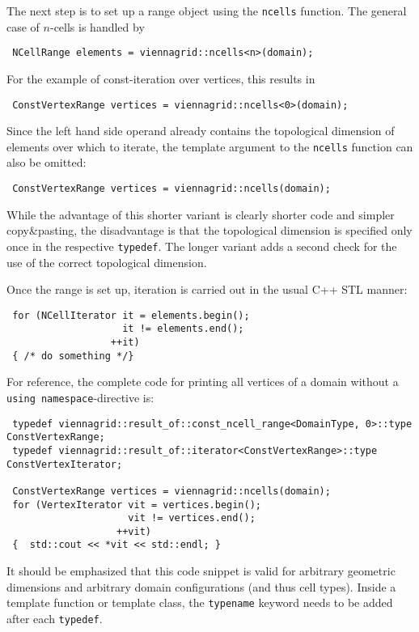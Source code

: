 The next step is to set up a range object using the \lstinline|ncells| function.
The general case of $n$-cells is handled by
\begin{lstlisting}
 NCellRange elements = viennagrid::ncells<n>(domain);
\end{lstlisting}
For the example of const-iteration over vertices, this results in
\begin{lstlisting}
 ConstVertexRange vertices = viennagrid::ncells<0>(domain);
\end{lstlisting}
Since the left hand side operand already contains the topological dimension of elements over which to iterate, 
the template argument to the \lstinline|ncells| function can also be omitted:
\begin{lstlisting}
 ConstVertexRange vertices = viennagrid::ncells(domain);
\end{lstlisting}
While the advantage of this shorter variant is clearly shorter code and simpler copy\&pasting, the disadvantage is that the topological dimension is specified only once in the respective \lstinline|typedef|. The longer variant adds a second check for the use of the correct topological dimension.

Once the range is set up, iteration is carried out in the usual C++ STL manner:
\begin{lstlisting}
 for (NCellIterator it = elements.begin();
                    it != elements.end();
                  ++it)
 { /* do something */}
\end{lstlisting}
For reference, the complete code for printing all vertices of a domain without a \lstinline|using namespace|-directive is:
\begin{lstlisting}
 typedef viennagrid::result_of::const_ncell_range<DomainType, 0>::type   ConstVertexRange;
 typedef viennagrid::result_of::iterator<ConstVertexRange>::type         ConstVertexIterator;

 ConstVertexRange vertices = viennagrid::ncells(domain);
 for (VertexIterator vit = vertices.begin();
                     vit != vertices.end();
                   ++vit)
 {  std::cout << *vit << std::endl; }
\end{lstlisting}
It should be emphasized that this code snippet is valid for arbitrary geometric dimensions and arbitrary domain configurations (and thus cell types). Inside a template function or template class, the \lstinline|typename| keyword needs to be added after each \lstinline|typedef|.



